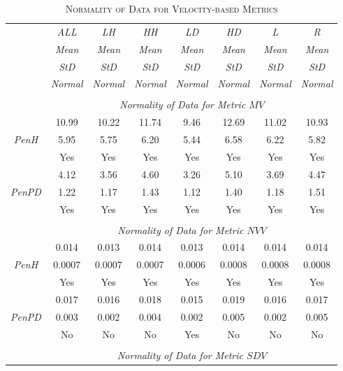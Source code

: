 \begin{table}[h]
\centering
\caption{\textsc{Normality of Data for Velocity-based Metrics}}
\begin{tabular*}{0.9\textwidth}{@{\extracolsep{\fill}} c | c  c  c  c  c  c  c}
	& {\textit{ALL}} & {\textit{LH}} & {\textit{HH}} & {\textit{LD}} & {\textit{HD}} & {\textit{L}} & {\textit{R}} \\
	\cline{2-8} 
	\cline{2-8} 
	& {\textit{Mean}} & {\textit{Mean}} & {\textit{Mean}} & {\textit{Mean}} & {\textit{Mean}} & {\textit{Mean}} & {\textit{Mean}} \\
	& {\textit{StD}} & {\textit{StD}} & {\textit{StD}} & {\textit{StD}} & {\textit{StD}} & {\textit{StD}} & {\textit{StD}} \\
	& {\textit{Normal}} & {\textit{Normal}} & {\textit{Normal}} & {\textit{Normal}} & {\textit{Normal}} & {\textit{Normal}} & {\textit{Normal}} \\
	\cline{2-8}
	\\
	& \multicolumn{7}{c}{\textit{Normality of Data for Metric $MV$}} \\
	\hline 	\hline
	& 10.99 & 10.22 & 11.74 & 9.46 & 12.69 & 11.02 & 10.93 \\
	{\textit{PenH}} & 5.95 & 5.75 & 6.20 & 5.44 & 6.58 & 6.22 & 5.82 \\
	& Yes & Yes & Yes & Yes & Yes & Yes & Yes \\
	\hline
	& 4.12 & 3.56 & 4.60 & 3.26 & 5.10 & 3.69 & 4.47 \\
	{\textit{PenPD}} & 1.22 & 1.17 & 1.43 & 1.12 & 1.40 & 1.18 & 1.51 \\
	& Yes & Yes & Yes & Yes & Yes & Yes & Yes \\
	\\
	& \multicolumn{7}{c}{\textit{Normality of Data for Metric $NVV$}} \\
	\hline 	\hline
	& 0.014 & 0.013 & 0.014 & 0.013 & 0.014 & 0.014 & 0.014 \\
	{\textit{PenH}} & 0.0007 & 0.0007 & 0.0007 & 0.0006 & 0.0008 & 0.0008 & 0.0008 \\
	& Yes & Yes & Yes & Yes & Yes & Yes & Yes \\
	\hline
	& 0.017 & 0.016 & 0.018 & 0.015 & 0.019 & 0.016 & 0.017 \\
	{\textit{PenPD}} & 0.003 & 0.002 & 0.004 & 0.002 & 0.005 & 0.002 & 0.005 \\
	& No & No & No & Yes & No & No & No \\
	\\
	& \multicolumn{7}{c}{\textit{Normality of Data for Metric $SDV$}} \\

\end{tabular*}
\end{table}
